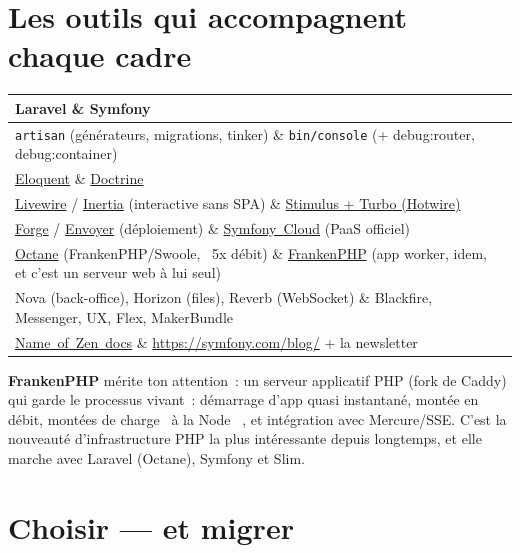 \documentclass[12pt,a4paper,twoside,openright]{book}
\makeatletter
\newcommand{\link}[2]{\href{#2}{#1}}
\newenvironment{tabz}[1]{\rowcolors{2}{white}{tralight}%
  \small\setlength{\tabcolsep}{5pt}\setlength{\LTpre}{3pt}\setlength{\LTpost}{3pt}%
  \begin{longtable}{@{}#1@{}}\toprule}
  {\bottomrule\end{longtable}\normalfont\setlength{\tabcolsep}{6pt}}
\newcommand{\thd}[1]{\textbf{\color{white}#1}}
\newcommand{\headrow}{\rowcolor{theadbg}}
\makeatother
\begin{document}
\section{Les outils qui accompagnent chaque cadre}

\begin{tabz}{XX}
  \headrow \thd{Laravel} \& \thd{Symfony} \\
  \midrule
  \verb|artisan| (g\'en\'erateurs, migrations, tinker) \& \verb|bin/console| (+ debug:router, debug:container) \\
  \link{Eloquent}{https://laravel.com/docs/eloquent} \& \link{Doctrine}{https://www.doctrine-project.org/projects/orm.html} \\
  \link{Livewire}{https://livewire.laravel.com/} / \link{Inertia}{https://inertiajs.com/} (interactive sans SPA) \& \link{Stimulus + Turbo (Hotwire)}{https://symfony.com/doc/current/frontend/htmx.html} \\
  \link{Forge}{https://forge.laravel.com/} / \link{Envoyer}{https://envoyer.io/} (d\'eploiement) \& \link{Symfony~Cloud}{https://symfony.com/cloud/} (PaaS officiel) \\
  \link{Octane}{https://laravel.com/docs/octane} (FrankenPHP/Swoole, ~5x d\'ebit) \& \link{FrankenPHP}{https://frankenphp.dev/} (app worker, idem, et c'est un serveur web \`a lui seul) \\
  Nova (back-office), Horizon (files), Reverb (WebSocket) \& Blackfire, Messenger, UX, Flex, MakerBundle \\
  \link{Name~of~Zen~docs}{https://laravel-news.com/} \& \url{https://symfony.com/blog/} + la newsletter \\
\end{tabz}

\begin{astuce}
\textbf{FrankenPHP} m\'erite ton attention~: un serveur applicatif PHP (fork de Caddy) qui garde le
processus vivant~: d\'emarrage d'app quasi instantan\'e, mont\'ee en d\'ebit, mont\'ees de charge \og ~\`a la
Node~ \fg{}, et int\'egration avec Mercure/SSE. C'est la nouveaut\'e d'infrastructure PHP la plus
int\'eressante depuis longtemps, et elle marche avec Laravel (Octane), Symfony et Slim.
\end{astuce}

\section{Choisir --- et migrer}
\end{document}
